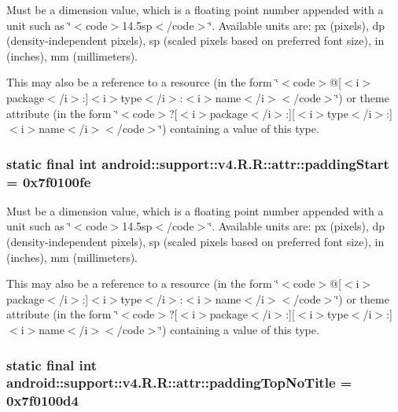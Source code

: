 Must be a dimension value, which is a floating point number appended with a unit such as \char`\"{}$<$code$>$14.5sp$<$/code$>$\char`\"{}. Available units are: px (pixels), dp (density-independent pixels), sp (scaled pixels based on preferred font size), in (inches), mm (millimeters). 

This may also be a reference to a resource (in the form \char`\"{}$<$code$>$@\mbox{[}$<$i$>$package$<$/i$>$:\mbox{]}$<$i$>$type$<$/i$>$:$<$i$>$name$<$/i$>$$<$/code$>$\char`\"{}) or theme attribute (in the form \char`\"{}$<$code$>$?\mbox{[}$<$i$>$package$<$/i$>$:\mbox{]}\mbox{[}$<$i$>$type$<$/i$>$:\mbox{]}$<$i$>$name$<$/i$>$$<$/code$>$\char`\"{}) containing a value of this type. \hypertarget{classandroid_1_1support_1_1v4_1_1_r_1_1attr_b5d43600988608de10d25765dd9d51fc}{
\subsubsection[{paddingStart}]{\setlength{\rightskip}{0pt plus 5cm}static final int android::support::v4.R.R::attr::paddingStart = 0x7f0100fe}}
\label{classandroid_1_1support_1_1v4_1_1_r_1_1attr_b5d43600988608de10d25765dd9d51fc}


Must be a dimension value, which is a floating point number appended with a unit such as \char`\"{}$<$code$>$14.5sp$<$/code$>$\char`\"{}. Available units are: px (pixels), dp (density-independent pixels), sp (scaled pixels based on preferred font size), in (inches), mm (millimeters). 

This may also be a reference to a resource (in the form \char`\"{}$<$code$>$@\mbox{[}$<$i$>$package$<$/i$>$:\mbox{]}$<$i$>$type$<$/i$>$:$<$i$>$name$<$/i$>$$<$/code$>$\char`\"{}) or theme attribute (in the form \char`\"{}$<$code$>$?\mbox{[}$<$i$>$package$<$/i$>$:\mbox{]}\mbox{[}$<$i$>$type$<$/i$>$:\mbox{]}$<$i$>$name$<$/i$>$$<$/code$>$\char`\"{}) containing a value of this type. \hypertarget{classandroid_1_1support_1_1v4_1_1_r_1_1attr_1cfd408354d2004a75602bd8e5a81359}{
\subsubsection[{paddingTopNoTitle}]{\setlength{\rightskip}{0pt plus 5cm}static final int android::support::v4.R.R::attr::paddingTopNoTitle = 0x7f0100d4}}
\label{classandroid_1_1support_1_1v4_1_1_r_1_1attr_1cfd408354d2004a75602bd8e5a81359}


